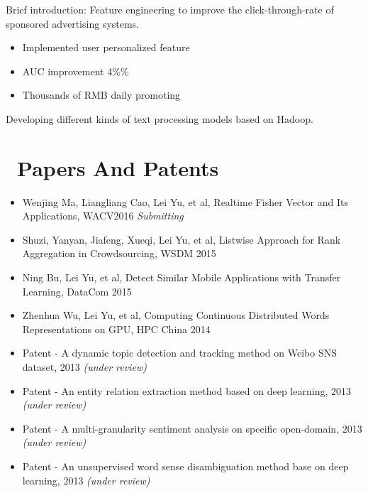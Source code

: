 \documentclass{resume}
\begin{document}
Brief introduction: Feature engineering to improve the click-through-rate of sponsored advertising systems. 
\begin{itemize}
  \item Implemented user personalized feature
  \item AUC improvement 4\%\%
  \item Thousands of RMB daily promoting 
\end{itemize}

Developing different kinds of text processing models based on Hadoop. 


\section{\faBook\ Papers And Patents}
\begin{itemize}[parsep=0.5ex]
  \item Wenjing Ma, Liangliang Cao, Lei Yu, et al, Realtime Fisher Vector and Its Applications, WACV2016 \textit{Submitting}
  \item Shuzi, Yanyan, Jiafeng, Xueqi, Lei Yu, et al, Listwise Approach for Rank Aggregation in Crowdsourcing, WSDM 2015
  \item Ning Bu, Lei Yu, et al, Detect Similar Mobile Applications with Transfer Learning, DataCom 2015
  \item Zhenhua Wu, Lei Yu, et al, Computing Continuous Distributed Words Representations on GPU, HPC China 2014
  \item Patent - A dynamic topic detection and tracking method on Weibo SNS dataset, 2013 \textit{(under review)}
  \item Patent - An entity relation extraction method based on deep learning, 2013 \textit{(under review)}
  \item Patent - A multi-granularity sentiment analysis on specific open-domain, 2013 \textit{(under review)}
  \item Patent - An unsupervised word sense disambiguation method base on deep learning, 2013 \textit{(under review)}
\end{itemize}
\end{document}
